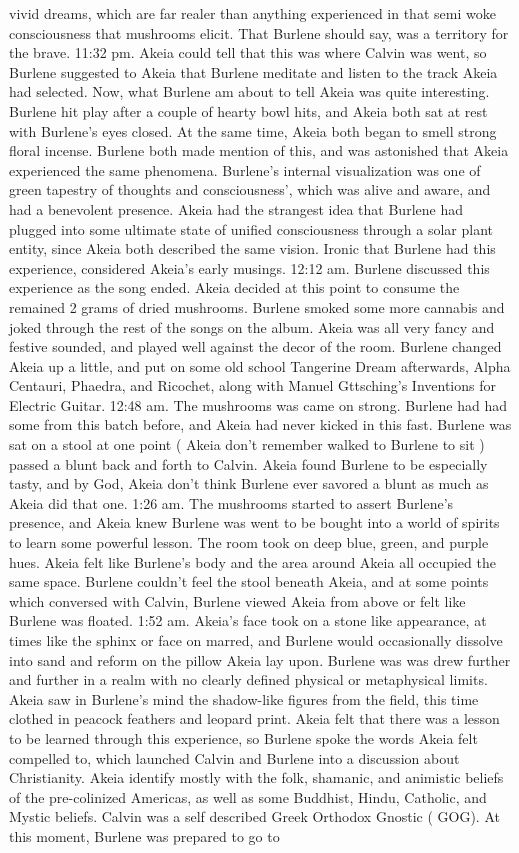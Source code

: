 \documentclass[12pt]{book}
\begin{document}
vivid dreams, which are far realer than anything experienced in that semi woke consciousness that mushrooms elicit. That Burlene should say, was a territory for the brave. 11:32 pm. Akeia could tell that this was where Calvin was went, so Burlene suggested to Akeia that Burlene meditate and listen to the track Akeia had selected. Now, what Burlene am about to tell Akeia was quite interesting. Burlene hit play after a couple of hearty bowl hits, and Akeia both sat at rest with Burlene's eyes closed. At the same time, Akeia both began to smell strong floral incense. Burlene both made mention of this, and was astonished that Akeia experienced the same phenomena. Burlene's internal visualization was one of green tapestry of thoughts and consciousness', which was alive and aware, and had a benevolent presence. Akeia had the strangest idea that Burlene had plugged into some ultimate state of unified consciousness through a solar plant entity, since Akeia both described the same vision. Ironic that Burlene had this experience, considered Akeia's early musings. 12:12 am. Burlene discussed this experience as the song ended. Akeia decided at this point to consume the remained 2 grams of dried mushrooms. Burlene smoked some more cannabis and joked through the rest of the songs on the album. Akeia was all very fancy and festive sounded, and played well against the decor of the room. Burlene changed Akeia up a little, and put on some old school Tangerine Dream afterwards, Alpha Centauri, Phaedra, and Ricochet, along with Manuel Gttsching's Inventions for Electric Guitar. 12:48 am. The mushrooms was came on strong. Burlene had had some from this batch before, and Akeia had never kicked in this fast. Burlene was sat on a stool at one point ( Akeia don't remember walked to Burlene to sit ) passed a blunt back and forth to Calvin. Akeia found Burlene to be especially tasty, and by God, Akeia don't think Burlene ever savored a blunt as much as Akeia did that one. 1:26 am. The mushrooms started to assert Burlene's presence, and Akeia knew Burlene was went to be bought into a world of spirits to learn some powerful lesson. The room took on deep blue, green, and purple hues. Akeia felt like Burlene's body and the area around Akeia all occupied the same space. Burlene couldn't feel the stool beneath Akeia, and at some points which conversed with Calvin, Burlene viewed Akeia from above or felt like Burlene was floated. 1:52 am. Akeia's face took on a stone like appearance, at times like the sphinx or face on marred, and Burlene would occasionally dissolve into sand and reform on the pillow Akeia lay upon. Burlene was was drew further and further in a realm with no clearly defined physical or metaphysical limits. Akeia saw in Burlene's mind the shadow-like figures from the field, this time clothed in peacock feathers and leopard print. Akeia felt that there was a lesson to be learned through this experience, so Burlene spoke the words Akeia felt compelled to, which launched Calvin and Burlene into a discussion about Christianity. Akeia identify mostly with the folk, shamanic, and animistic beliefs of the pre-colinized Americas, as well as some Buddhist, Hindu, Catholic, and Mystic beliefs. Calvin was a self described Greek Orthodox Gnostic ( GOG). At this moment, Burlene was prepared to go to 
\end{document}
